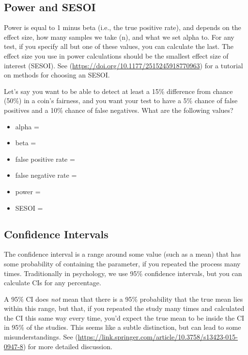 \documentclass[
  oneside]{book}
\providecommand{\tightlist}{%
  \setlength{\itemsep}{0pt}\setlength{\parskip}{0pt}}
\begin{document}
\hypertarget{power}{%
\subsection{Power and SESOI}\label{power}}

Power is equal to 1 minus beta (i.e., the true positive rate), and depends on the effect size, how many samples we take (n), and what we set alpha to. For any test, if you specify all but one of these values, you can calculate the last. The effect size you use in power calculations should be the smallest effect size of interest (SESOI). See \citep{TOSTtutorial}(\url{https://doi.org/10.1177/2515245918770963}) for a tutorial on methods for choosing an SESOI.

\begin{try}

Let's say you want to be able to detect at least a 15\% difference from chance (50\%) in a coin's fairness, and you want your test to have a 5\% chance of false positives and a 10\% chance of false negatives. What are the following values?

\begin{itemize}
\tightlist
\item
  alpha =
\item
  beta =
\item
  false positive rate =
\item
  false negative rate =
\item
  power =
\item
  SESOI =
\end{itemize}

\end{try}

\hypertarget{conf-int}{%
\subsection{Confidence Intervals}\label{conf-int}}

The confidence interval is a range around some value (such as a mean) that has some probability of containing the parameter, if you repeated the process many times. Traditionally in psychology, we use 95\% confidence intervals, but you can calculate CIs for any percentage.

\begin{info}
A 95\% CI does \emph{not} mean that there is a 95\% probability that the true mean lies within this range, but that, if you repeated the study many times and calculated the CI this same way every time, you'd expect the true mean to be inside the CI in 95\% of the studies. This seems like a subtle distinction, but can lead to some misunderstandings. See \citep{Morey2016}(\url{https://link.springer.com/article/10.3758/s13423-015-0947-8}) for more detailed discussion.

\end{info}
\end{document}
